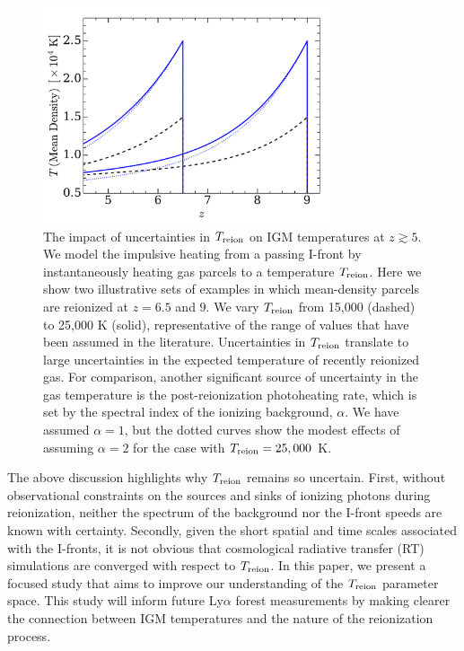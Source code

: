 \documentclass[twocolumn]{aastex62}
\newcommand{\Treion}{T_{\rm reion}}
\begin{document}
\begin{figure}
\centerline{
\includegraphics[width=8.5cm]{fig1.pdf}
}
\caption{The impact of uncertainties in $\Treion$ on IGM temperatures at $z\gtrsim5$.  We model the impulsive heating from a passing I-front by instantaneously heating gas parcels to a temperature $\Treion$.  Here we show two illustrative sets of examples in which mean-density parcels are reionized at $z=6.5$ and $9$.  We vary $\Treion$ from 15,000 (dashed) to 25,000 K (solid), representative of the range of values that have been assumed in the literature.  Uncertainties in $\Treion$ translate to large uncertainties in the expected temperature of recently reionized gas.  For comparison, another significant source of uncertainty in the gas temperature is the post-reionization photoheating rate, which is set by the spectral index of the ionizing background, $\alpha$. We have assumed $\alpha=1$, but the dotted curves show the modest effects of assuming $\alpha = 2$ for the case with $\Treion=25,000$ K.}
\label{FIG:T_intro}
\end{figure}

The above discussion highlights why $\Treion$ remains so uncertain.  First, without observational constraints on the sources and sinks of ionizing photons during reionization, neither the spectrum of the background nor the I-front speeds are known with certainty.  Secondly, given the short spatial and time scales associated with the I-fronts, it is not obvious that cosmological radiative transfer (RT) simulations are converged with respect to $\Treion$.  In this paper, we present a focused study that aims to improve our understanding of the $\Treion$ parameter space.  This study will inform future Ly$\alpha$ forest measurements by making clearer the connection between IGM temperatures and the nature of the reionization process.  
\end{document}
